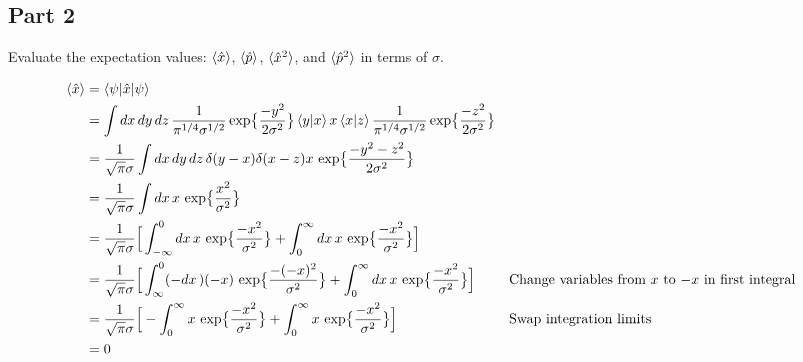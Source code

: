 \documentclass{article}
\newcommand{\D}[1]{{d#1 \,}}
\renewcommand{\exp}[1]{\,\text{exp} \big\{ #1 \big\} }
\begin{document}
\subsection*{Part 2}
Evaluate the expectation values:
\( \braket{\hat{x}} \),
\( \braket{\hat{p}} \),
\( \braket{\hat{x}^2} \), and
\( \braket{\hat{p}^2} \)
in terms of $\sigma$.

\begin{align*}
    \braket{\hat{x}}
    &= \braket{\psi|\hat{x}|\psi} \\
    &= \int \D{x}\D{y}\D{z}
        \frac{1}{\pi^{1/4}\sigma^{1/2}} \exp{\frac{-y^2}{2\sigma^2}}
        \braket{y|x}x\braket{x|z}
        \frac{1}{\pi^{1/4}\sigma^{1/2}} \exp{\frac{-z^2}{2\sigma^2}} \\
    &= \frac{1}{\sqrt{\pi}\sigma} \int \D{x}\D{y}\D{z}
        \delta(y-x)\delta(x-z) x \, \exp{\frac{-y^2-z^2}{2\sigma^2}} \\
    &= \frac{1}{\sqrt{\pi}\sigma} \int \D{x} x \, \exp{\frac{x^2}{\sigma^2}} \\
    &= \frac{1}{\sqrt{\pi}\sigma} \Big[ 
        \int_{-\infty}^{0} \D{x} x \, \exp{\frac{-x^2}{\sigma^2}} +
        \int_{0}^{\infty} \D{x} x \, \exp{\frac{-x^2}{\sigma^2}} \Big] \\
    &= \frac{1}{\sqrt{\pi}\sigma} \Big[ 
        \int_{\infty}^{0} (-\D{x}) (-x) \, \exp{\frac{-(-x)^2}{\sigma^2}} +
        \int_{0}^{\infty} \D{x} x \, \exp{\frac{-x^2}{\sigma^2}} \Big]
        && \text{Change variables from $x$ to $-x$ in first integral} \\
    &= \frac{1}{\sqrt{\pi}\sigma} \Big[ 
        - \int^{\infty}_{0} x \, \exp{\frac{-x^2}{\sigma^2}} +
        \int_{0}^{\infty} x \, \exp{\frac{-x^2}{\sigma^2}} \Big]
        && \text{Swap integration limits} \\
    &= 0
\end{align*}
\end{document}
